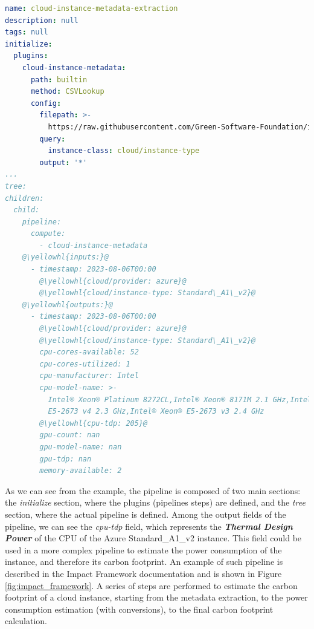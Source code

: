 \begin{lstlisting}[language=yaml, caption={Cloud Metadata extraction example}, label={lst:cloud_metadata_example}]
name: cloud-instance-metadata-extraction
description: null
tags: null
initialize:
  plugins:
    cloud-instance-metadata:
      path: builtin
      method: CSVLookup
      config:
        filepath: >-
          https://raw.githubusercontent.com/Green-Software-Foundation/if-data/main/cloud-metdata-azure-instances.csv
        query:
          instance-class: cloud/instance-type
        output: '*'
...
tree:
children:
  child:
    pipeline:
      compute:
        - cloud-instance-metadata
    @\yellowhl{inputs:}@
      - timestamp: 2023-08-06T00:00
        @\yellowhl{cloud/provider: azure}@
        @\yellowhl{cloud/instance-type: Standard\_A1\_v2}@
    @\yellowhl{outputs:}@
      - timestamp: 2023-08-06T00:00
        @\yellowhl{cloud/provider: azure}@
        @\yellowhl{cloud/instance-type: Standard\_A1\_v2}@
        cpu-cores-available: 52
        cpu-cores-utilized: 1
        cpu-manufacturer: Intel
        cpu-model-name: >-
          Intel® Xeon® Platinum 8272CL,Intel® Xeon® 8171M 2.1 GHz,Intel® Xeon®
          E5-2673 v4 2.3 GHz,Intel® Xeon® E5-2673 v3 2.4 GHz
        @\yellowhl{cpu-tdp: 205}@
        gpu-count: nan
        gpu-model-name: nan
        gpu-tdp: nan
        memory-available: 2
\end{lstlisting}

As we can see from the example, the pipeline is composed of two main sections: the \textit{initialize} section, where the plugins (pipelines steps) are defined, and the \textit{tree} section, where the actual pipeline is defined.
Among the output fields of the pipeline, we can see the \textit{cpu-tdp} field, which represents the \textbf{\textit{Thermal Design Power}} of the CPU of the Azure Standard\_A1\_v2 instance.
This field could be used in a more complex pipeline to estimate the power consumption of the instance, and therefore its carbon footprint.
An example of such pipeline is described in the Impact Framework documentation \cite{impact_framework_pipeline} and is shown in Figure \ref{fig:impact_framework}.
A series of steps are performed to estimate the carbon footprint of a cloud instance, starting from the metadata extraction, to the power consumption estimation (with conversions), to the final carbon footprint calculation.

\newpage

